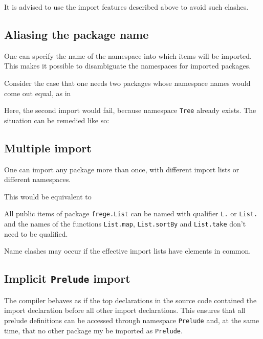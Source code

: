 It is advised to use the import features described above to avoid such clashes.

\subsection{Aliasing the package name}
One can specify the name of the namespace into which
items will be imported. This makes it possible to disambiguate the
namespaces for imported packages.

Consider the case that one needs two packages whose namespace names would come out equal, as in


Here, the second import would fail, because namespace \texttt{Tree} already
exists. The situation can be remedied like so:


\subsection{Multiple import}
One can import any package more than once, with different import
lists or different namespaces. 


This would be equivalent to 


All public items of package \texttt{frege.List} can be named with qualifier \texttt{L.} or \texttt{List.} 
and the names of the functions \texttt{List.map},  \texttt{List.sortBy} and  \texttt{List.take} don't need to be qualified.

Name clashes may occur if the effective import lists have elements in common. 

\subsection{Implicit \texttt{Prelude} import}
The compiler behaves as if the top declarations in
the source code contained the import declaration
before all other import declarations.
This ensures that all prelude definitions can be accessed through
namespace \texttt{Prelude} and, at the same time, that no other package my be imported as {\tt Prelude}.

